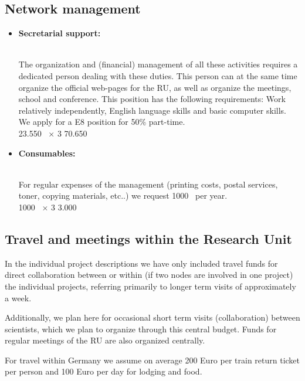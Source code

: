 \documentclass[10pt,fleqn,twoside]{article}
\begin{document}
\subsection{Network management}
\begin{itemize}
\item
\begin{Emphasize}
{\bf Secretarial support:}
\end{Emphasize}\\
The organization and (financial) management of all these activities requires
a dedicated person dealing with these duties. This person can at the same
time organize the official web-pages for the RU, as well as organize the
meetings, school and conference. This position has the following
requirements: Work relatively independently, English language skills and
basic computer skills. We apply for a E8 position for 50\% part-time.
\vspace{0.2em}\\
23.550~\EUR{} $\times$ 3              \hfill 70.650~\EUR{}\\
\item 
\begin{Emphasize}
{\bf Consumables:}
\end{Emphasize}\\
For regular expenses of the management (printing costs, postal services, toner,
copying materials, etc..) we request 1000~\EUR{} per year.
\vspace{0.2em}\\
1000~\EUR{} $\times$ 3              \hfill 3.000~\EUR{}\\
\end{itemize}

\subsection{Travel and meetings within the Research Unit}
In the individual project descriptions we have only included travel funds
for direct collaboration between or within (if two nodes are involved in one
project) the individual projects, referring primarily to longer term visits
of approximately a week.

Additionally, we plan here for  occasional short term visits
(collaboration) between scientists, which we plan to organize through this
central budget. Funds for regular meetings of the RU are also organized
centrally. 

For travel within Germany we assume on average 200 Euro per train return ticket
per person and 100 Euro per day for lodging and food. 
\end{document}
